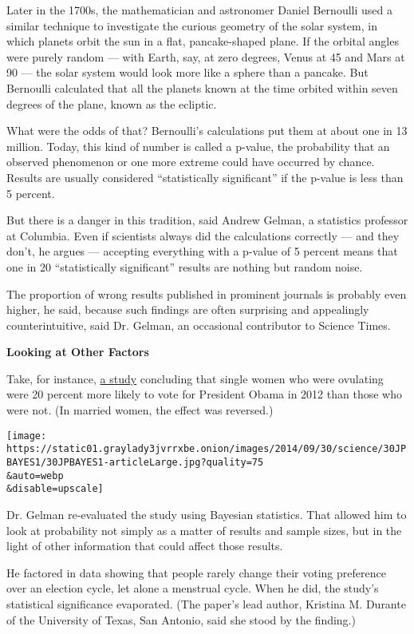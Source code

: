 Later in the 1700s, the mathematician and astronomer Daniel Bernoulli
used a similar technique to investigate the curious geometry of the
solar system, in which planets orbit the sun in a flat, pancake-shaped
plane. If the orbital angles were purely random --- with Earth, say, at
zero degrees, Venus at 45 and Mars at 90 --- the solar system would look
more like a sphere than a pancake. But Bernoulli calculated that all the
planets known at the time orbited within seven degrees of the plane,
known as the ecliptic.

What were the odds of that? Bernoulli's calculations put them at about
one in 13 million. Today, this kind of number is called a p-value, the
probability that an observed phenomenon or one more extreme could have
occurred by chance. Results are usually considered ``statistically
significant'' if the p-value is less than 5 percent.

But there is a danger in this tradition, said Andrew Gelman, a
statistics professor at Columbia. Even if scientists always did the
calculations correctly --- and they don't, he argues --- accepting
everything with a p-value of 5 percent means that one in 20
``statistically significant'' results are nothing but random noise.

The proportion of wrong results published in prominent journals is
probably even higher, he said, because such findings are often
surprising and appealingly counterintuitive, said Dr. Gelman, an
occasional contributor to Science Times.

\textbf{Looking at Other Factors}

Take, for instance,
\href{http://pss.sagepub.com/content/early/2013/04/23/0956797612466416.abstract}{a
study} concluding that single women who were ovulating were 20 percent
more likely to vote for President Obama in 2012 than those who were not.
(In married women, the effect was reversed.)

\texttt{[image: https://static01.graylady3jvrrxbe.onion/images/2014/09/30/science/30JPBAYES1/30JPBAYES1-articleLarge.jpg?quality=75\\\&auto=webp\\\&disable=upscale]}

Dr. Gelman re-evaluated the study using Bayesian statistics. That
allowed him to look at probability not simply as a matter of results and
sample sizes, but in the light of other information that could affect
those results.

He factored in data showing that people rarely change their voting
preference over an election cycle, let alone a menstrual cycle. When he
did, the study's statistical significance evaporated. (The paper's lead
author, Kristina M. Durante of the University of Texas, San Antonio,
said she stood by the finding.)

